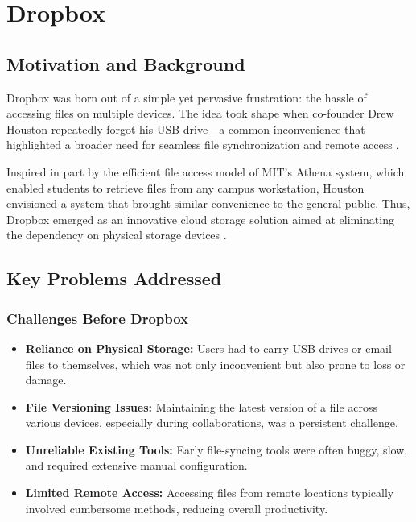 \chapter{Dropbox}\label{chap:dropbox}

\section{Motivation and Background}
Dropbox was born out of a simple yet pervasive frustration: the hassle of accessing files on multiple devices. The idea took shape when co-founder Drew Houston repeatedly forgot his USB drive—a common inconvenience that highlighted a broader need for seamless file synchronization and remote access \cite{BusinessInsider2018}.

Inspired in part by the efficient file access model of MIT’s Athena system, which enabled students to retrieve files from any campus workstation, Houston envisioned a system that brought similar convenience to the general public. Thus, Dropbox emerged as an innovative cloud storage solution aimed at eliminating the dependency on physical storage devices \cite{Awfis2021}.

\section{Key Problems Addressed}
\subsection{Challenges Before Dropbox}
\begin{itemize}
    \item \textbf{Reliance on Physical Storage:} Users had to carry USB drives or email files to themselves, which was not only inconvenient but also prone to loss or damage.
    \item \textbf{File Versioning Issues:} Maintaining the latest version of a file across various devices, especially during collaborations, was a persistent challenge.
    \item \textbf{Unreliable Existing Tools:} Early file-syncing tools were often buggy, slow, and required extensive manual configuration.
    \item \textbf{Limited Remote Access:} Accessing files from remote locations typically involved cumbersome methods, reducing overall productivity.
\end{itemize}

